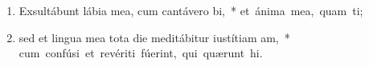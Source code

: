 \begin{flushleft}
\begin{enumerate}[leftmargin=*]
\item Exsultábunt lábia mea, cum cantávero bi,~* \mbox{et ánima mea, quam ti;}

\item sed et lingua mea tota die meditábitur iustítiam am,~* \mbox{cum confúsi et revériti fúerint, qui quærunt  hi.}


\end{enumerate}
\end{flushleft}

